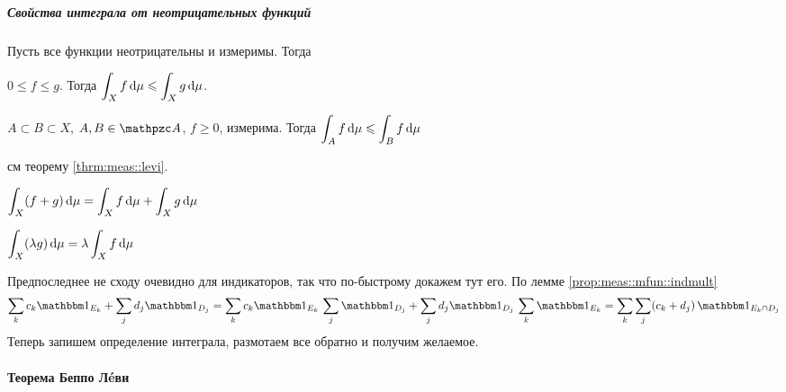 \documentclass[draft, timbord]{longnotes}
\begin{document}
\subparagraph{Свойства интеграла от неотрицательных функций}

\begin{prop}\label{prop:meas::int::pos}
Пусть все функции неотрицательны и измеримы. Тогда
\begin{enumerate}
  \item $0 \leqslant f \leqslant g$. Тогда
    $\displaystyle \int_X f\, \mathrm{d} \mu  \leqslant \int_X g\, \mathrm{d} \mu$.
  \item $A \subset B \subset X$, $A , B \in \alg$, $f \geqslant 0$, измерима.
    Тогда $\displaystyle \int_A f \, \mathrm{d} \mu \leqslant \int_B f\, \mathrm{d} \mu$
  \item см теорему \ref{thrm:meas::levi}.
  \item $\displaystyle \int_X (f+g)\, \mathrm{d} \mu = \int_X f\,\mathrm{d} \mu + \int_X g\,\mathrm{d} \mu $
  \item $\displaystyle \int_X (\lambda g)\, \mathrm{d} \mu =  \lambda \int_X f\,\mathrm{d} \mu $
\end{enumerate}
\end{prop}
\begin{rem}\label{rem:meas::int::poshard}
  Предпоследнее не сходу очевидно для индикаторов, так что по-быстрому докажем тут его.
  По лемме \ref{prop:meas::mfun::indmult}
  \[
    \sum_k c_k \ind_{E_k} + \sum_j d_j \ind_{D_j} 
    = \sum_k c_k \ind_{E_k} \, \sum_j \ind_{D_j} + \sum_j d_j \ind_{D_j} \, \sum_k \ind_{E_k}
    = \sum_k \sum_j (c_k  + d_j) \, \ind_{E_k \cap D_j}
  \]
  Теперь запишем определение интеграла, размотаем все обратно и получим желаемое.
\end{rem}

\paragraph{Теорема Беппо \texorpdfstring{Л\'eви}{Леви}}
\label{par:meas::levi}
\end{document}
